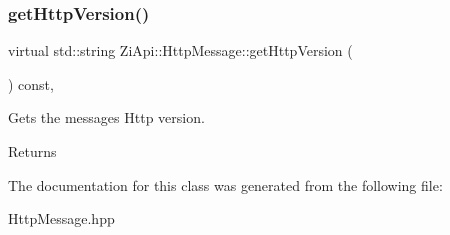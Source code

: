 \subsubsection{\texorpdfstring{getHttpVersion()}{getHttpVersion()}}
{\footnotesize\ttfamily virtual std\+::string Zi\+Api\+::\+Http\+Message\+::get\+Http\+Version (\begin{DoxyParamCaption}{ }\end{DoxyParamCaption}) const\hspace{0.3cm}{\ttfamily [pure virtual]}, {\ttfamily [noexcept]}}



Gets the message\textquotesingle{}s Http version. 

\begin{DoxyReturn}{Returns}

\begin{DoxyCode}{0}
\DoxyCodeLine{\textcolor{stringliteral}{"HTTP/major.minor"} }
\end{DoxyCode}
 
\end{DoxyReturn}


The documentation for this class was generated from the following file\+:\begin{DoxyCompactItemize}
\item 
Http\+Message.\+hpp\end{DoxyCompactItemize}
